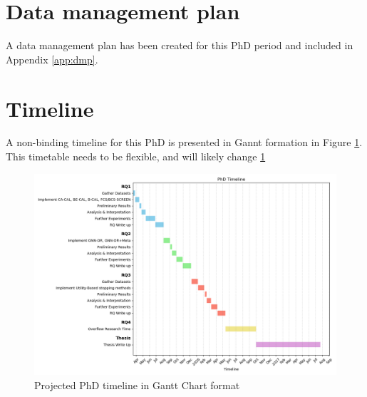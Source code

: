 \documentclass[10pt,oneside]{book}
\begin{document}
\section{Data management plan}

A data management plan has been created for this PhD period and included in Appendix \ref{app:dmp}.


\section{Timeline}

A non-binding timeline for this PhD is presented in Gannt formation in Figure \ref{fig:gantt}. This timetable needs to be flexible, and will likely change \ref{fig:gantt}

\begin{figure}
    \centering
    \includegraphics[width=1\linewidth]{Confirmation Review/images/Gantt.png}
    \caption{Projected PhD timeline in Gantt Chart format}
    \label{fig:gantt}
\end{figure}
\end{document}
